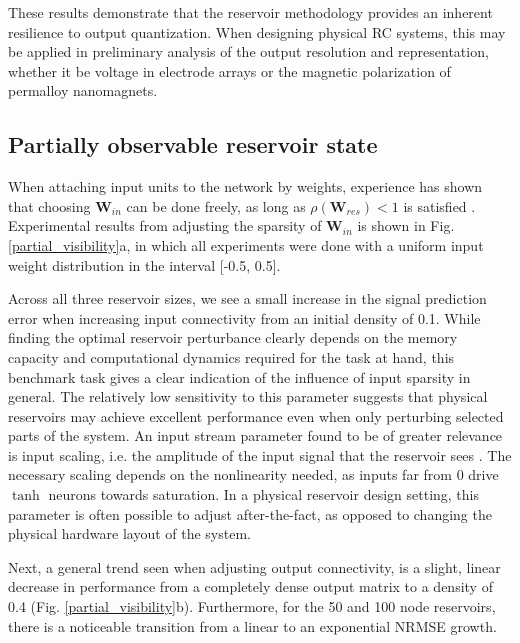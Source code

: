 These results demonstrate that the reservoir methodology provides an inherent
resilience to output quantization. When designing physical RC systems, this may
be applied in preliminary analysis of the output resolution and representation,
whether it be voltage in electrode arrays or the magnetic polarization of
permalloy nanomagnets.


\subsection{Partially observable reservoir state}

When attaching input units to the network by weights, experience has shown that
choosing $\mathbf{W}_{in}$ can be done freely, as long as
$\rho(\mathbf{W}_{res}) < 1$ is satisfied \cite{jaeger_echo_2001}. Experimental
results from adjusting the sparsity of $\mathbf{W}_{in}$ is shown in
Fig. \ref{partial_visibility}a, in which all experiments were done with a
uniform input weight distribution in the interval [-0.5, 0.5].

Across all three reservoir sizes, we see a small increase in the signal
prediction error when increasing input connectivity from an initial density of
0.1. While finding the optimal reservoir perturbance clearly depends on the
memory capacity and computational dynamics required for the task at hand, this
benchmark task gives a clear indication of the influence of input sparsity in
general. The relatively low sensitivity to this parameter suggests that physical
reservoirs may achieve excellent performance even when only perturbing selected
parts of the system. An input stream parameter found to be of greater relevance
is input scaling, i.e. the amplitude of the input signal that the reservoir sees
\cite{alippi_quantification_2009}. The necessary scaling depends on the
nonlinearity needed, as inputs far from 0 drive $\tanh$ neurons towards
saturation. In a physical reservoir design setting, this parameter is often
possible to adjust after-the-fact, as opposed to changing the physical hardware
layout of the system.

Next, a general trend seen when adjusting output connectivity, is a slight,
linear decrease in performance from a completely dense output matrix to a
density of 0.4 (Fig. \ref{partial_visibility}b). Furthermore, for the 50 and 100
node reservoirs, there is a noticeable transition from a linear to an
exponential NRMSE growth.

